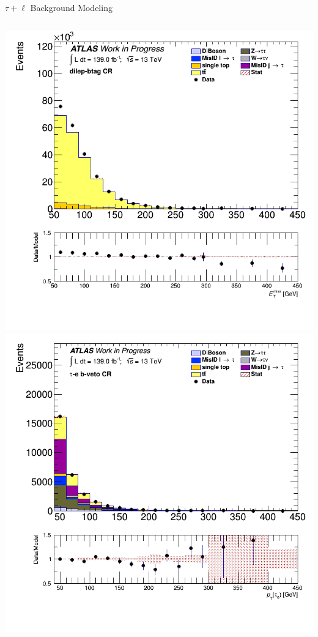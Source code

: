 \documentclass[aspectratio=169,xcolor=table]{beamer}
\begin{document}
      \begin{frame}[t]{$\tau+\ell$ Background Modeling}
        \begin{columns}[t]

          \includegraphics[height=.45\textheight,keepaspectratio=true]{taulep_1p_3p/v09/met_et_DILEP_BTAG.png}
          \includegraphics[height=.45\textheight,keepaspectratio=true]{taulep_1p_3p/v09/tau_0_pt_TAUEL_BVETO.png}


\end{columns}
\end{frame}
\end{document}
